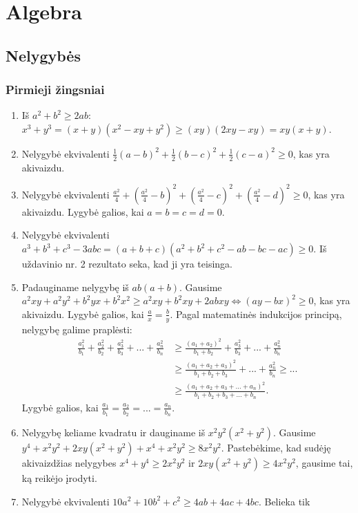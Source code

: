 \section*{Algebra}
\subsection*{Nelygybės}
\subsubsection*{Pirmieji žingsniai}
\begin{enumerate}
\item
    Iš $a^2+b^2\geq2ab$:
    $x^3+y^3=(x+y)(x^2-xy+y^2)\geq(xy)(2xy-xy)=xy(x+y)$.
\item
    Nelygybė ekvivalenti
    $\frac{1}{2}(a-b)^2+\frac{1}{2}(b-c)^2+\frac{1}{2}(c-a)^2\geq 0$, kas
    yra akivaizdu.
\item
    Nelygybė ekvivalenti
    $\frac{a^2}{4}+\left(\frac{a^2}{4}-b\right)^2+\left(\frac{a^2}{4}-c\right)^2+\left(\frac{a^2}{4}-d\right)^2\geq0$,
    kas yra akivaizdu. Lygybė galios, kai $a=b=c=d=0$.
\item
    Nelygybė ekvivalenti
    $a^3+b^3+c^3-3abc=(a+b+c)(a^2+b^2+c^2-ab-bc-ac)\geq0.$ Iš uždavinio
    nr. 2 rezultato seka, kad ji yra teisinga.
\item
    Padauginame nelygybę iš $ab(a+b)$. Gausime
    $a^2xy+a^2y^2+b^2yx+b^2x^2\geq a^2xy+b^2xy+2abxy \Leftrightarrow
    (ay-bx)^2\geq0$, kas yra akivaizdu. Lygybė galios, kai
    $\frac{a}{x}=\frac{b}{y}$. Pagal matematinės indukcijos principą,
    nelygybę galime praplėsti:\begin{align*}
    \frac{a_1^2}{b_1}+\frac{a_2^2}{b_2}+\frac{a_3^2}{b_3}+...+\frac{a_n^2}{b_n}&\geq
    \frac{(a_1+a_2)^2}{b_1+b_2}+\frac{a_3^2}{b_3}+...+\frac{a_n^2}{b_n}\\
    &\geq\frac{(a_1+a_2+a_3)^2}{b_1+b_2+b_3}+...+\frac{a_n^2}{b_n}\geq...\\
    &\geq\frac{(a_1+a_2+a_3+...+a_n)^2}{b_1+b_2+b_3+...+b_n}.\end{align*}
    Lygybė galios, kai
    $\frac{a_1}{b_1}=\frac{a_2}{b_2}=...=\frac{a_n}{b_n}.$
\item
    Nelygybę keliame kvadratu ir dauginame iš $x^2y^2(x^2+y^2)$. Gausime
    $y^4+x^2y^2+2xy(x^2+y^2)+x^4+x^2y^2\geq 8x^2y^2.$ Pastebėkime, kad
    sudėję akivaizdžias nelygybes $x^4+y^4\geq2x^2y^2$ ir
    $2xy(x^2+y^2)\geq4x^2y^2$, gausime tai, ką reikėjo įrodyti.
\item
    Nelygybė ekvivalenti $10a^2+10b^2+c^2\geq4ab+4ac+4bc.$ Belieka tik

\end{enumerate}
